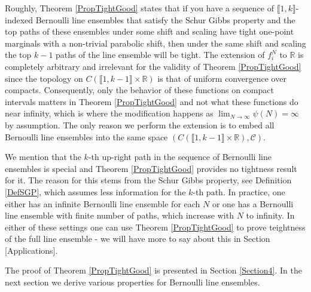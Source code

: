 Roughly, Theorem \ref{PropTightGood} states that if you have a sequence of $\llbracket 1, k \rrbracket$-indexed Bernoulli line ensembles that satisfy the Schur Gibbs property and the top paths of these ensembles under some shift and scaling have tight one-point marginals with a non-trivial parabolic shift, then  under the same shift and scaling the top $k-1$ paths of the line ensemble will be tight. The extension of $f^N_i$ to $\mathbb{R}$ is completely arbitrary and irrelevant for the validity of Theorem \ref{PropTightGood} since the topology on $C( \llbracket 1, k -1 \rrbracket \times \mathbb{R})$ is that of uniform convergence over compacts. Consequently, only the behavior of these functions on compact intervals matters in Theorem \ref{PropTightGood} and not what these functions do near infinity, which is where the modification happens as $\lim_{N \rightarrow \infty} \psi(N) = \infty$  by assumption. The only reason we perform the extension is to embed all Bernoulli line ensembles into the same space $(C( \llbracket 1, k -1 \rrbracket \times \mathbb{R}), \mathcal{C})$.

 We mention that the $k$-th up-right path in the sequence of Bernoulli line ensembles is special and Theorem \ref{PropTightGood} provides no tightness result for it. The reason for this stems from the Schur Gibbs property, see Definition \ref{DefSGP}, which assumes less information for the $k$-th path. In practice, one either has an infinite Bernoulli line ensemble for each $N$ or one has a Bernoulli line ensemble with finite number of paths, which increase with $N$ to infinity. In either of these settings one can use Theorem \ref{PropTightGood} to prove teightness of the full line ensemble - we will have more to say about this in Section [Applications].

The proof of Theorem \ref{PropTightGood} is presented in Section \ref{Section4}. In the next section we derive various properties for Bernoulli line ensembles.







